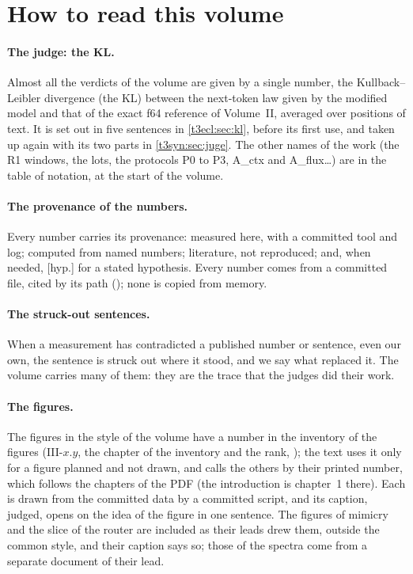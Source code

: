 \section{How to read this volume}\label{t3int:sec:lire}

\paragraph{The judge: the KL.} Almost all the verdicts of the volume are given by a single number, the Kullback--Leibler divergence (the KL) between the next-token law given by the modified model and that of the exact f64 reference of Volume~II, averaged over positions of text. It is set out in five sentences in \cref{t3ecl:sec:kl}, before its first use, and taken up again with its two parts in \cref{t3syn:sec:juge}. The other names of the work (the R1 windows, the lots, the protocols P0 to P3, A\_ctx and A\_flux\dots) are in the table of notation, at the start of the volume.

\paragraph{The provenance of the numbers.} Every number carries its provenance: \mes{} measured here, with a committed tool and log; \calc{} computed from named numbers; \litt{} literature, not reproduced; and, when needed, [hyp.] for a stated hypothesis. Every number comes from a committed file, cited by its path (); none is copied from memory.

\paragraph{The struck-out sentences.} When a measurement has contradicted a published number or sentence, even our own, the sentence is struck out  where it stood, and we say what replaced it. The volume carries many of them: they are the trace that the judges did their work.

\paragraph{The figures.} The figures in the style of the volume have a number in the inventory of the figures (III-$x$.$y$, the chapter of the inventory and the rank, ); the text uses it only for a figure planned and not drawn, and calls the others by their printed number, which follows the chapters of the PDF (the introduction is chapter~1 there). Each is drawn from the committed data by a committed script, and its caption, judged, opens on the idea of the figure in one sentence. The figures of mimicry and the slice of the router are included as their leads drew them, outside the common style, and their caption says so; those of the spectra come from a separate document of their lead.

